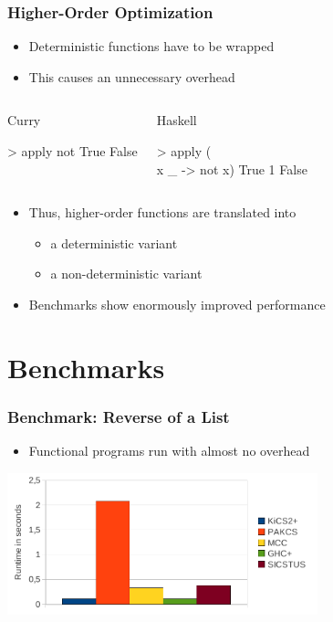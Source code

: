\documentclass[utf8]{beamer}
\newenvironment{program}{\begin{semiverbatim}\small}{\end{semiverbatim}}
\begin{document}
\begin{frame}[fragile]
\frametitle{Higher-Order Optimization}

\begin{itemize}
\item Deterministic functions have to be wrapped
\item This causes an unnecessary overhead
\end{itemize}

\begin{columns}[t]
\begin{block}{Curry}
\begin{program}
> apply not True
False
\end{program}
\end{block}
\begin{block}{Haskell}
\begin{program}
> apply (\\x _ -> not x) True 1
False
\end{program}
\end{block}
\end{columns}
\vspace{3ex}
\begin{itemize}
\item Thus, higher-order functions are translated into
  \begin{itemize}
   \item a deterministic variant
   \item a non-deterministic variant
  \end{itemize}
\item Benchmarks show enormously improved performance
\end{itemize}
\end{frame}


\section{Benchmarks}

\begin{frame}
\frametitle{Benchmark: Reverse of a List}
\begin{itemize}
\item Functional programs run with almost no overhead
\end{itemize}
\begin{center}
\includegraphics[width=9cm]{reverse}
\end{center}
\end{frame}
\end{document}
